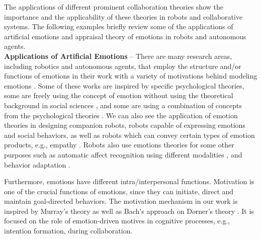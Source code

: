 The applications of different prominent collaboration theories show the
importance and the applicability of these theories in robots and collaborative
systems. The following examples briefly review some of the applications of
artificial emotions and appraisal theory of emotions in robots and autonomous
agents.\\

\textbf{Applications of Artificial Emotions} -- There are many research areas,
including robotics and autonomous agents, that employ the structure and/or
functions of emotions in their work with a variety of motivations behind
modeling emotions \cite{wehrle:motivations-modeling-emotion}. Some of these
works are inspired by specific psychological theories, some are freely using the
concept of emotion without using the theoretical background in social sciences
\cite{urban:pecs}, and some are using a combination of concepts from the
psychological theories \cite{kiryazov:modeling-appraisal-pad}. We can also see
the application of emotion theories in designing companion robots, robots
capable of expressing emotions and social behaviors, as well as robots which can
convey certain types of emotion products, e.g., empathy
\cite{breazeal:expressive-behavior,paiva:emotion-modeling,shayganfar:methodology}.
Robots also use emotions theories for some other purposes such as automatic
affect recognition using different modalities \cite{zeng:affect-recognition},
and behavior adaptation \cite{liu:affect-robot-behavior}.

Furthermore, emotions have different intra/interpersonal functions. Motivation
is one of the crucial functions of emotions, since they can initiate, direct and
maintain goal-directed behaviors. The motivation mechanism in our work is
inspired by Murray's theory as well as Bach's approach on D$\ddot{o}$rner's
theory
\cite{bach:micropsi-agent-architecture,bach:psi,bach:motivaitional-system-ai,bach:next-generation-micropsi}.
It is focused on the role of emotion-driven motives in cognitive processes,
e.g., intention formation, during collaboration.\\

